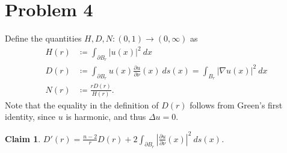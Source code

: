 \documentclass[10pt]{amsart}
\theoremstyle{thmstyle}
\newtheorem*{claim}{Claim}
\theoremstyle{defstyle}
\begin{document}
\section{Problem 4}

Define the quantities $H, D, N: (0, 1)\to (0,\infty)$ as 
\begin{align*}
    H(r) &\coloneq \int_{\partial B_r} |u(x)|^2~dx\\
    D(r) &\coloneq \int_{\partial B_r} u(x)\frac{\partial u}{\partial\nu}(x)~ds(x) = \int_{B_r}|\nabla u(x)|^2~dx\\
    N(r) &\coloneq\frac{rD(r)}{H(r)}.
\end{align*}
Note that the equality in the definition of $D(r)$ follows from Green's first identity, since $u$ is harmonic, and thus $\Delta u = 0$.

\begin{claim}
        $\displaystyle D'(r) = \frac{n - 2}{r}D(r) + 2\int_{\partial B_r}\left|\frac{\partial u}{\partial\nu}(x)\right|^2~ds(x)$.
\end{claim}
\end{document}
